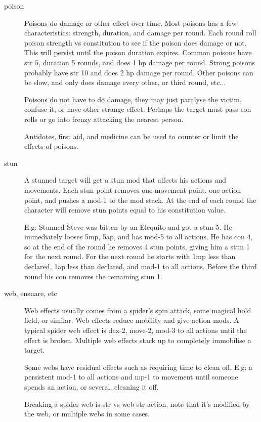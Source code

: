 \begin{description}


\item[poison]
Poisons do damage or other effect over time. Most poisons has a few characteristics: strength, duration, and damage per round. Each round roll poison strength vs constitution to see if the poison does damage or not. This will persist until the poison duration expires. Common poisons have str 5, duration 5 rounds, and does 1 hp damage per round. Strong poisons probably have str 10 and does 2 hp damage per round. Other poisons can be slow, and only does damage every other, or third round, etc...

Poisons do not have to do damage, they may just paralyse the victim, confuse it, or have other strange effect. Perhaps the target must pass con rolls or go into frenzy attacking the nearest person.

Antidotes, first aid, and medicine can be used to counter or limit the effects of poisons.


\item[stun]
A stunned target will get a stun mod that affects his actions and movements. Each stun point removes one movement point, one action point, and pushes a mod-1 to the mod stack. At the end of each round the character will remove stun points equal to his constitution value.

E.g: Stunned Steve was bitten by an Elequito and got a stun 5. He immediately looses 5mp, 5ap, and has mod-5 to all actions. He has con 4, so at the end of the round he removes 4 stun points, giving him a stun 1 for the next round. For the next round he starts with 1mp less than declared, 1ap less than declared, and mod-1 to all actions. Before the third round his con removes the remaining stun 1.


\item[web, ensnare, etc]
Web effects usually comes from a spider's spin attack, some magical hold field, or similar. Web effects reduce mobility and give action mods.
A typical spider web effect is dex-2, move-2, mod-3 to all actions until the effect is broken. Multiple web effects stack up to completely immobilise a target.

Some webs have residual effects such as requiring time to clean off. E.g: a persistent mod-1 to all actions and mp-1 to movement until someone spends an action, or several, cleaning it off.

Breaking a spider web is str vs web str action, note that it's modified by the web, or multiple webs in some cases.


\end{description}
